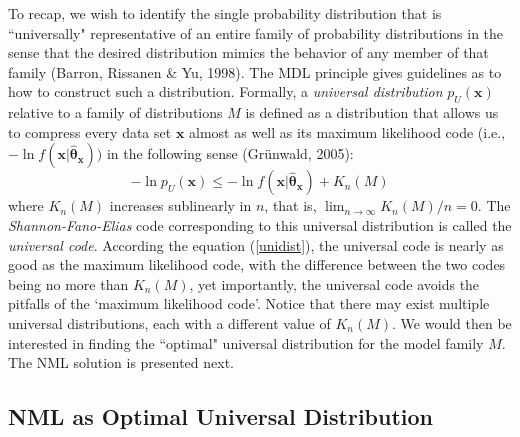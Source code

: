\documentclass{elsart}
\begin{document}
To recap, we wish to identify the single probability distribution that is ``universally"
representative of an entire family of probability distributions in the sense that the desired
distribution mimics the behavior of any member of that family (Barron, Rissanen \& Yu, 1998). The
MDL principle gives guidelines as to how to construct such a distribution. Formally, a {\it
universal distribution} $p_U(\bm x)$ relative to a family of distributions $M$ is defined as a
distribution that allows us to compress every data set $\bm x $ almost as well as its maximum
likelihood code (i.e., $-\ln f(\bm x| \hat{\bm \theta}_{\bm x})) $ in the following sense
(Gr\"{u}nwald, 2005):
\begin{equation}\label{unidist}
-\ln p_U(\bm x) \leq -\ln f(\bm x | \hat{\bm \theta}_{\bm x}) + K_n (M)
\end{equation}
where $K_n(M)$ increases sublinearly in $n$, that is, $\displaystyle\lim_{n \rightarrow \infty}
K_n(M)/n =0$. The {\it Shannon-Fano-Elias} code corresponding to this universal distribution is
called the {\it universal code}. According the equation (\ref{unidist}), the universal code is
nearly as good as the maximum likelihood code, with the difference between the two codes being no
more than $K_n(M)$, yet importantly, the universal code avoids the pitfalls of the `maximum
likelihood code'. Notice that there may exist multiple universal distributions, each with a
different value of $K_n(M)$. We would then be interested in finding the ``optimal" universal
distribution for the model family $M$. The NML solution is presented next.


\subsection{NML as Optimal Universal Distribution}
\end{document}
